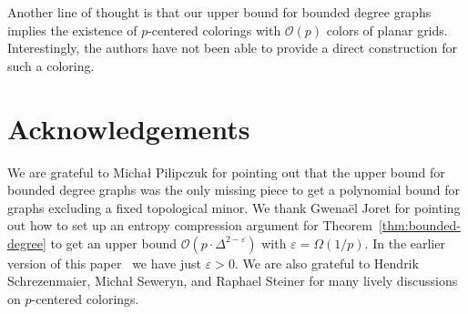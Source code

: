 Another line of thought is that our upper bound for bounded degree graphs implies the existence of $p$-centered colorings 
with $\mathcal{O}(p)$ colors of planar grids.
Interestingly, the authors have not been able to provide a direct construction for such a coloring.

\section*{Acknowledgements}
We are grateful to Micha{\l} Pilipczuk for pointing out 
that the upper bound for bounded degree graphs was the only missing 
piece to get a polynomial bound for graphs excluding a fixed topological minor.
We thank Gwenaël Joret for pointing out how to set up an entropy compression argument 
for Theorem~\ref{thm:bounded-degree} to get
an upper bound $\mathcal{O}(p\cdot\Delta^{2-\varepsilon})$ with $\varepsilon=\Omega(1/p)$. 
In the earlier version of this paper~\cite{DFMS20} we have just $\varepsilon>0$.
We are also grateful to Hendrik Schrezenmaier, Micha{\l} Seweryn, and Raphael Steiner
for many lively discussions on $p$-centered colorings.

